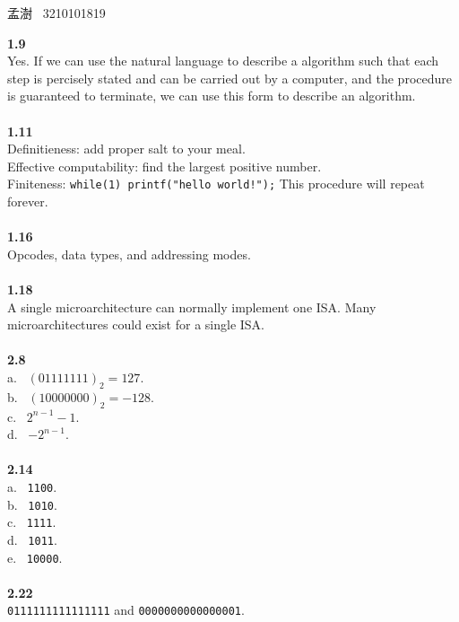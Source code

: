 \documentclass[a4paper,12pt]{article}     %
\begin{document}
\begin{center}   %
孟澍 \ 3210101819
\end{center}

\noindent %
\textbf{1.9}\\
Yes. If we can use the natural language to describe a algorithm such that each step is percisely stated and can be carried out by a computer, and the procedure is guaranteed to terminate, we can use this form to describe an algorithm. \\

~\\
\textbf{1.11}\\
Definitieness: add proper salt to your meal.\\
Effective computability: find the largest positive number.\\
Finiteness: \verb|while(1) printf("hello world!");| This procedure will repeat forever.\\

~\\
\textbf{1.16}\\
Opcodes, data types, and addressing modes.\\

~\\
\textbf{1.18}\\
A single microarchitecture can normally implement one ISA. Many microarchitectures could exist for a single ISA.\\

~\\
\textbf{2.8}\\
a. \ $(01111111)_2 = 127.$\\
b. \ $(10000000)_2 = -128.$\\
c. \ $2^{n-1}-1.$\\
d. \ $-2^{n-1}.$\\

~\\
\textbf{2.14}\\
a. \ \verb|1100|.\\
b. \ \verb|1010|.\\
c. \ \verb|1111|.\\
d. \ \verb|1011|.\\
e. \ \verb|10000|.\\

~\\
\textbf{2.22}\\
\verb|0111111111111111| and \verb|0000000000000001|.\\
\end{document}
